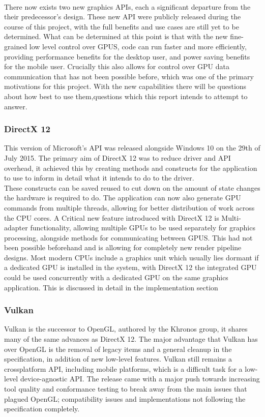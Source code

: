 \documentclass[12pt,a4paper]{article}
\begin{document}
\\
There now exists two new graphics APIs, each a significant departure from the their predecessor's design. These new API were publicly released during the course of this project, with the full benefits and use cases are still yet to be determined. What can be determined at this point is that with the new fine-grained low level control over GPUS, code can run faster and more efficiently, providing performance benefits for the desktop user, and power saving benefits for the mobile user. Crucially this also allows for control over GPU data communication that has not been possible before, which was one of the primary motivations for this project. With the new capabilities there will be questions about how best to use them,questions which this report intends to attempt to answer.


\subsubsection{DirectX 12}
This version of Microsoft’s API was released alongside Windows 10 on the 29th of  July 2015.
The primary aim of DirectX 12 was to reduce driver and API overhead, it achieved this by creating methods and constructs for the application to use to inform in detail what it intends to do to the driver.
\\
These constructs can be saved  reused to cut down on the amount of state changes the hardware is required to do. The application can now also generate GPU commands from multiple threads, allowing for better distribution of work across the CPU cores. A Critical new feature introduced with DirectX 12 is Multi-adapter functionality, allowing multiple GPUs to be used separately for graphics processing, alongside methods for communicating between GPUS. This had not been possible beforehand and is allowing for completely new render pipeline designs. Most modern CPUs include a graphics unit which usually lies dormant if a dedicated GPU is installed in the system, with DirectX 12 the integrated GPU could be used concurrently with a dedicated GPU on the same graphics application. This is discussed in detail in the implementation section

\subsubsection{Vulkan}
Vulkan is the successor to OpenGL, authored by the Khronos group, it shares many of the same advances as DirectX 12. The major advantage that Vulkan has over OpenGL is the removal of legacy items and a general cleanup in the specification, in addition of new low-level features. Vulkan still remains a crossplatform API, including mobile platforms, which is a difficult task for a low-level device-agnostic API. The release came with a major push towards increasing tool quality and conformance testing to break away from the main issues that plagued OpenGL; compatibility issues and implementations not following the specification completely.
\end{document}
